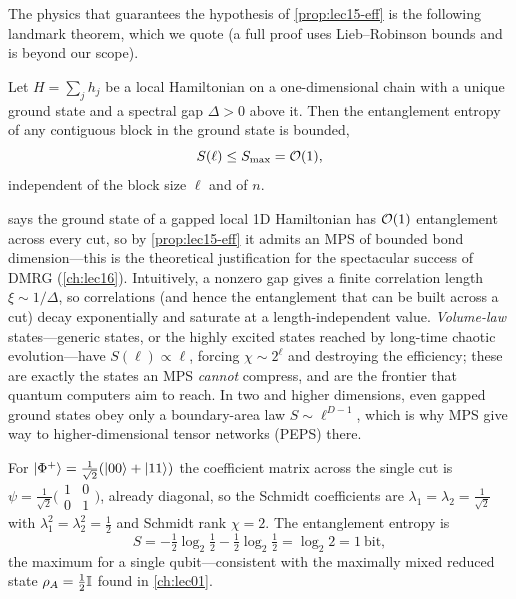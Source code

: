 The physics that guarantees the hypothesis of \cref{prop:lec15-eff} is the
following landmark theorem, which we quote (a full proof uses Lieb--Robinson
bounds and is beyond our scope).

\begin{theorem}\label{thm:lec15-hastings}
Let $H=\sum_j h_j$ be a local Hamiltonian on a one-dimensional chain with a
unique ground state and a spectral gap $\Delta>0$ above it. Then the entanglement
entropy of any contiguous block in the ground state is bounded,
\[
  S(\ell)\le S_{\max}=\mathcal{O}(1),
\]
independent of the block size $\ell$ and of $n$.
\end{theorem}

\begin{remark}
 says the ground state of a gapped local 1D Hamiltonian
has $\mathcal{O}(1)$ entanglement across every cut, so by \cref{prop:lec15-eff} it
admits an MPS of bounded bond dimension---this is the theoretical justification
for the spectacular success of DMRG (\cref{ch:lec16}). Intuitively, a nonzero gap
gives a finite correlation length $\xi\sim1/\Delta$, so correlations (and hence
the entanglement that can be built across a cut) decay exponentially and saturate
at a length-independent value. \emph{Volume-law} states---generic states, or the
highly excited states reached by long-time chaotic evolution---have
$S(\ell)\propto\ell$, forcing $\chi\sim 2^{\ell}$ and destroying the efficiency;
these are exactly the states an MPS \emph{cannot} compress, and are the frontier
that quantum computers aim to reach. In two and higher dimensions, even gapped
ground states obey only a boundary-area law $S\sim\ell^{D-1}$, which is why MPS
give way to higher-dimensional tensor networks (PEPS) there.
\end{remark}

\begin{example}\label{exa:lec15-bell}
For $\ket{\Phi^{+}}=\tfrac1{\sqrt2}(\ket{00}+\ket{11})$ the coefficient matrix
across the single cut is $\psi=\tfrac1{\sqrt2}\bigl(\begin{smallmatrix}1&0\\0&1\end{smallmatrix}\bigr)$,
already diagonal, so the Schmidt coefficients are $\lambda_1=\lambda_2=\tfrac1{\sqrt2}$
with $\lambda_1^{2}=\lambda_2^{2}=\tfrac12$ and Schmidt rank $\chi=2$. The
entanglement entropy is
\[
  S=-\tfrac12\log_2\tfrac12-\tfrac12\log_2\tfrac12=\log_2 2=1\ \text{bit},
\]
the maximum for a single qubit---consistent with the maximally mixed reduced state
$\rho_A=\tfrac12\mathbb{I}$ found in \cref{ch:lec01}.
\end{example}

